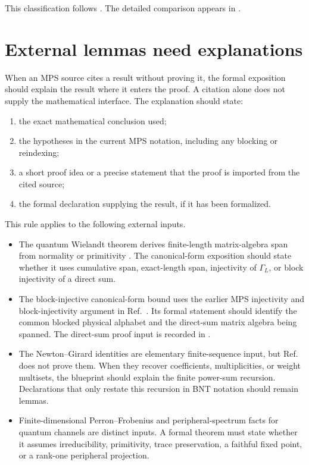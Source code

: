 \documentclass{article}
\begin{document}
This classification follows
. The detailed comparison appears in
.

\section{External lemmas need explanations}

When an MPS source cites a result without proving it, the formal exposition
should explain the result where it enters the proof. A citation alone does not
supply the mathematical interface. The explanation should state:
\begin{enumerate}
    \item the exact mathematical conclusion used;
    \item the hypotheses in the current MPS notation, including any blocking
          or reindexing;
    \item a short proof idea or a precise statement that the proof is imported
          from the cited source;
    \item the formal declaration supplying the result, if it has been
          formalized.
\end{enumerate}

This rule applies to the following external inputs.
\begin{itemize}
    \item The quantum Wielandt theorem derives finite-length matrix-algebra
          span from normality or primitivity
          \cite{Sanz2010Quantum}. The canonical-form exposition should state
          whether it uses cumulative span, exact-length span, injectivity of
          $\Gamma_L$, or block injectivity of a direct sum.
    \item The block-injective canonical-form bound uses the earlier MPS
          injectivity and block-injectivity argument in
          Ref.~\cite{PerezGarcia2007MPSReps}. Its formal statement should
          identify the common blocked physical alphabet and the direct-sum
          matrix algebra being spanned. The direct-sum proof input is recorded
          in .
    \item The Newton--Girard identities are elementary finite-sequence input,
          but Ref.~\cite{Cirac2016MPDO_arXiv} does not prove them. When they
          recover coefficients, multiplicities, or weight multisets, the
          blueprint should explain the finite power-sum recursion.
          Declarations that only restate this recursion in BNT notation should
          remain lemmas.
    \item Finite-dimensional Perron--Frobenius and peripheral-spectrum facts
          for quantum channels are distinct inputs. A formal theorem must state
          whether it assumes irreducibility, primitivity, trace preservation, a
          faithful fixed point, or a rank-one peripheral projection.
\end{itemize}
\end{document}
